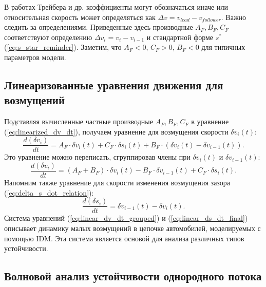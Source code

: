 \documentclass[12pt, a4paper]{article}
\begin{document}
В работах Трейбера и др. коэффициенты могут обозначаться иначе или относительная скорость может определяться как $\Delta v = v_{lead} - v_{follower}$. Важно следить за определениями. Приведенные здесь производные $A_F, B_F, C_F$ соответствуют определению $\Delta v_i = v_i - v_{i-1}$ и стандартной форме $s^*$ (\ref{eq:s_star_reminder}).
Заметим, что $A_F < 0$, $C_F > 0$, $B_F < 0$ для типичных параметров модели.

\subsection{Линеаризованные уравнения движения для возмущений}
\label{subsec:linearized_equations_perturbations}

Подставляя вычисленные частные производные $A_F, B_F, C_F$ в уравнение (\ref{eq:linearized_dv_dt}), получаем уравнение для возмущения скорости $\delta v_i(t)$:
\begin{equation}
\label{eq:linear_dv_dt_final}
\frac{d(\delta v_i)}{dt} = A_F \cdot \delta v_i(t) + C_F \cdot \delta s_i(t) + B_F \cdot (\delta v_i(t) - \delta v_{i-1}(t)).
\end{equation}
Это уравнение можно переписать, сгруппировав члены при $\delta v_i(t)$ и $\delta v_{i-1}(t)$:
\begin{equation}
\label{eq:linear_dv_dt_grouped}
\frac{d(\delta v_i)}{dt} = (A_F + B_F) \cdot \delta v_i(t) - B_F \cdot \delta v_{i-1}(t) + C_F \cdot \delta s_i(t).
\end{equation}
Напомним также уравнение для скорости изменения возмущения зазора (\ref{eq:delta_s_dot_relation}):
\begin{equation}
\label{eq:linear_ds_dt_final}
\frac{d(\delta s_i)}{dt} = \delta v_{i-1}(t) - \delta v_i(t).
\end{equation}
Система уравнений (\ref{eq:linear_dv_dt_grouped}) и (\ref{eq:linear_ds_dt_final}) описывает динамику малых возмущений в цепочке автомобилей, моделируемых с помощью IDM. Эта система является основой для анализа различных типов устойчивости.

\subsection{Волновой анализ устойчивости однородного потока}
\label{subsec:wave_stability_analysis}
\end{document}

